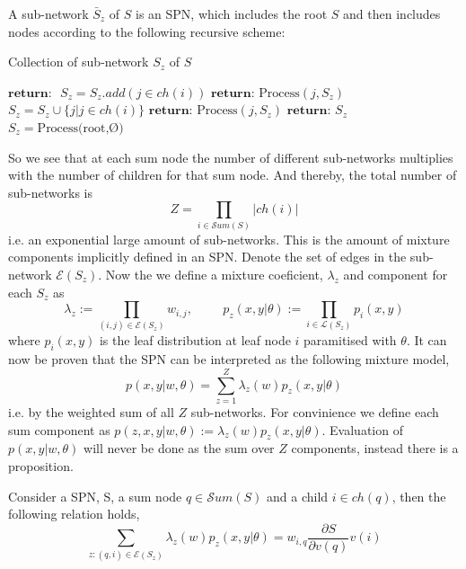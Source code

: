 \begin{definition} 
    A sub-network $\bar S_z$ of $S$ is an SPN, which includes the root $S$ and then includes nodes
    according to the following recursive scheme: 
\end{definition}
\begin{algorithm}[H]
    \caption*{Collection of sub-network $S_z$ of $S$}\label{SPN3}
    \begin{algorithmic}
        \State  $\textbf{return: }$ 
    \EndIf
        \State $S_z =S_z.add(j \in ch(i))$ 
        \State $\textbf{return: } \text{Process}(j, S_z)$
    \EndIf
        \State $S_z =S_z \cup \{j | j \in ch(i)\}$ 
            \State $\textbf{return: } \text{Process}(j,S_z)$
        \EndFor
    \EndIf
    \State $\textbf{return: } S_z$
    \EndFunction
    \State $S_z =  \text{Process(root,Ø)}$
    \end{algorithmic}
\end{algorithm}
So we see that at each sum node the number of different sub-networks multiplies with the number of children for that
sum node. And thereby, the total number of sub-networks is
 $$Z = \prod_{i\in \mathcal{S}um(S)}|ch(i)|$$ 
 i.e. an exponential large amount of sub-networks. This is the amount of
 mixture components implicitly defined in an SPN. 
 Denote the set of edges in the sub-network $\mathcal{E}(S_z)$.
Now the we define a mixture coeficient, $\lambda_z$ and component for each $S_z$ as 
$$\lambda_z := \prod_{(i,j)\in \mathcal{E}(S_z)} w_{i,j}, \hspace{1cm}
p_z(x,y|\theta) := \prod_{i \in \mathcal{L}(S_z)} p_i(x,y)$$
where $p_i(x,y)$ is the leaf distribution at leaf node $i$ paramitised with $\theta$. 
It can now be proven that the SPN can be interpreted as the following mixture model, 
$$p(x,y|w,\theta) = \sum_{z=1}^Z \lambda_z(w)p_z(x,y|\theta)$$
i.e. by the weighted sum of all $Z$ sub-networks. For convinience
we define each sum component as $p(z,x,y|w,\theta) := \lambda_z(w)p_z(x,y|\theta)$.
Evaluation of $p(x,y|w,\theta)$ will never be done as the sum over $Z$ components, 
instead there is a proposition. 

\begin{proposition}
    Consider a SPN, S, a sum node $q \in \mathcal{S}um(S)$ and a child $i \in ch(q)$,
    then the following relation holds, 
    $$\sum_{z:(q,i)\in \mathcal{E}(S_z)} \lambda_z(w) p_z(x,y|\theta) = w_{i,q}
    \frac{\partial S}{\partial v(q)} v(i)$$
\end{proposition}


